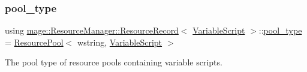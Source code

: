 \subsubsection{\texorpdfstring{pool\+\_\+type}{pool\_type}}
{\footnotesize\ttfamily using \hyperlink{structmage_1_1_resource_manager_1_1_resource_record}{mage\+::\+Resource\+Manager\+::\+Resource\+Record}$<$ \hyperlink{classmage_1_1_variable_script}{Variable\+Script} $>$\+::\hyperlink{structmage_1_1_resource_manager_1_1_resource_record_3_01_variable_script_01_4_a656ca7aee7665df5691f0950bac6fbad}{pool\+\_\+type} =  \hyperlink{classmage_1_1_resource_pool}{Resource\+Pool}$<$ wstring, \hyperlink{classmage_1_1_variable_script}{Variable\+Script} $>$}

The pool type of resource pools containing variable scripts. 